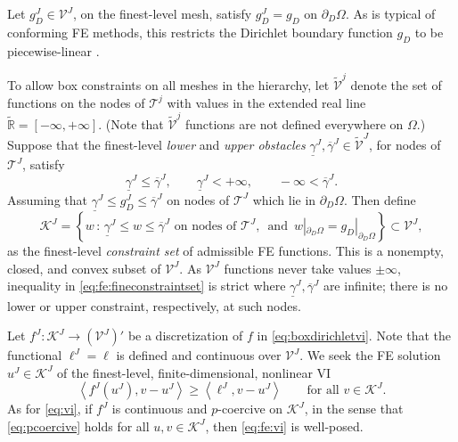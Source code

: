 \documentclass[letterpaper,final,12pt,reqno]{amsart}
\theoremstyle{cstyle}
\theoremstyle{cstyle*}
\theoremstyle{dstyle}
\numberwithin{equation}{section}
\numberwithin{figure}{section}
\numberwithin{table}{section}
\numberwithin{theorem}{section}
\newcommand{\RR}{\mathbb{R}}
\newcommand{\cK}{\mathcal{K}}
\newcommand{\ip}[2]{\left<#1,#2\right>}
\begin{document}
Let $g_D^J \in \mathcal{V}^J$, on the finest-level mesh, satisfy $g_D^J = g_D$ on $\partial_D \Omega$.  As is typical of conforming FE methods, this restricts the Dirichlet boundary function $g_D$ to be piecewise-linear \cite{Elmanetal2014}.

To allow box constraints on all meshes in the hierarchy, let $\tilde{\mathcal{V}}^j$ denote the set of functions on the nodes of $\mathcal{T}^j$ with values in the extended real line $\tilde{\RR} = [-\infty,+\infty]$.  (Note that $\tilde{\mathcal{V}}^j$ functions are not defined everywhere on $\Omega$.)  Suppose that the finest-level \emph{lower} and \emph{upper obstacles} $\underline{\gamma}^J, \overline{\gamma}^J \in \tilde{\mathcal{V}}^J$, for nodes of $\mathcal{T}^J$, satisfy
\begin{equation}
\underline{\gamma}^J \le \overline{\gamma}^J, \qquad \underline{\gamma}^J < +\infty, \qquad -\infty < \overline{\gamma}^J. \label{eq:fe:boxconstraintrequirements}
\end{equation}
Assuming that $\underline{\gamma}^J \le g_D^J \le \overline{\gamma}^J$ on nodes of $\mathcal{T}^J$ which lie in $\partial_D \Omega$.  Then define
\begin{equation}
\mathcal{K}^J = \left\{w\,:\,\underline{\gamma}^J \le w \le \overline{\gamma}^J \text{ on nodes of } \mathcal{T}^J, \, \text{ and } \, w|_{\partial_D\Omega} = g_D|_{\partial_D\Omega}\right\} \subset \mathcal{V}^J, \label{eq:fe:fineconstraintset}
\end{equation}
as the finest-level \emph{constraint set} of admissible FE functions.  This is a nonempty, closed, and convex subset of $\mathcal{V}^J$.  As $\mathcal{V}^J$ functions never take values $\pm\infty$, inequality in \eqref{eq:fe:fineconstraintset} is strict where $\underline{\gamma}^J, \overline{\gamma}^J$ are infinite; there is no lower or upper constraint, respectively, at such nodes.

Let $f^J:\mathcal{K}^J \to (\mathcal{V}^J)'$ be a discretization of $f$ in \eqref{eq:boxdirichletvi}.  Note that the functional $\ell^J=\ell$ is defined and continuous over $\mathcal{V}^J$.  We seek the FE solution $u^J \in \mathcal{K}^J$ of the finest-level, finite-dimensional, nonlinear VI
\begin{equation}
\ip{f^J(u^J)}{v-u^J} \ge \ip{\ell^J}{v-u^J} \qquad \text{for all } v\in \cK^J. \label{eq:fe:vi}
\end{equation}
As for \eqref{eq:vi}, if $f^J$ is continuous and $p$-coercive on $\mathcal{K}^J$, in the sense that \eqref{eq:pcoercive} holds for all $u,v \in \mathcal{K}^J$, then \eqref{eq:fe:vi} is well-posed.
\end{document}
